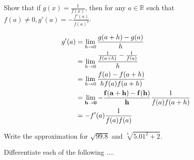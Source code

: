 \documentclass[answers,addpoints]{exam}
\begin{document}
\begin{questions}
\begin{solution}
    \end{solution}

    \question[5]
    Show that if $g(x) = \frac{1}{f(x)}$, then for any $a \in \mathbb{R}$ such
    that $f(a) \neq 0, g'(a) = -\frac{f'(a)}{f(a)^2}$.

    \begin{solution}

        \begin{align}
            g'(a) &= \lim_{h \rightarrow 0} \frac{g(a+h)-g(a)}{h} \\
                  &= \lim_{h \rightarrow 0} \frac{ \frac{1}{f(a+h)}-\frac{1}{f(a)}}{h} \\
                  &= \lim_{h \rightarrow 0} \frac{ f(a) - f(a+h) }{h f(a)
            f(a+h)}  \\
            &= {\bf \lim_{h \rightarrow 0} - \frac{ f(a+h) - f(h) }{h}} \frac{1}{f(a) f(a+h)}  \\
            &= - f'(a) \frac{1}{f(a)f(a)}
        \end{align}
        
    \end{solution}

    \question[5]
    Write the approximation for $\sqrt{99.8}$ and $\sqrt[3]{5.01^2 + 2}$.

    \begin{solution}
        
    \end{solution}

    \question[8]
    Differentiate each of the following $\ldots$.

    \begin{solution}
        
    \end{solution}


\end{questions}
\end{document}

